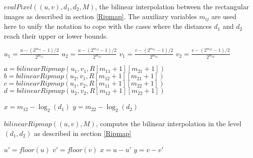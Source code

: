 \begin{algorithm}[H]
\caption{$evalPixel((u,v),d_1,d_2,M)$, the bilinear interpolation between the rectangular images as described in section \ref{Ripmap}.
The auxiliary variables $m_{ij}$ are used here to unify the notation to cope with the cases where the distances $d_1$ and $d_2$  reach their upper or lower bounds.}
\label{interbibi1}
$u_1=\frac{u-(2^{m_{11}}-1)/2}{2^{m_{11}}}$\;
$u_2=\frac{u-(2^{m_{12}}-1)/2}{2^{m_{12}}}$\;
$v_1=\frac{v-(2^{m_{21}}-1)/2}{2^{m_{21}}}$\;
$v_2=\frac{v-(2^{m_{22}}-1)/2}{2^{m_{22}}}$\;

$a=bilinearRipmap(u_1,v_1,R[m_{11}+1][m_{21}+1])$
$b=bilinearRipmap(u_2,v_1,R[m_{12}+1][m_{21}+1])$\;
$c=bilinearRipmap(u_1,v_2,R[m_{11}+1][m_{22}+1])$\;
$d=bilinearRipmap(u_2,v_2,R[m_{12}+1][m_{22}+1])$\;

$x = m_{12} - \log_2(d_1)$\;
$y = m_{22} - \log_2(d_2)$\;

\end{algorithm}


\begin{algorithm}[H]
\caption{$bilinearRipmap((u,v),M)$, computes the bilinear interpolation in the level $(d_1,d_2)$ as described in section \ref{Ripmap}}
\label{intertri2}
$u'=floor(u)$\;
$v' = floor(v)$\;
$x=u-u'$\;
$y = v-v'$\;
\;
\end{algorithm}



